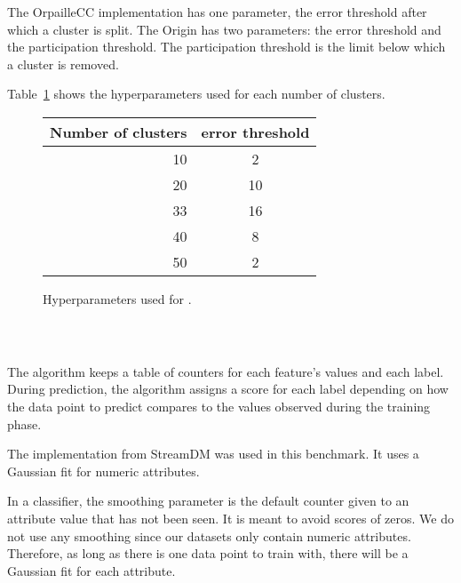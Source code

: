 The \mcnn OrpailleCC implementation has one
parameter, the error threshold after which a
cluster is split.  The \mcnn Origin has two
parameters: the error threshold and the
participation threshold. The participation
threshold is the limit below which a cluster is
removed.

Table~\ref{table:hyperparameter-mcnn} shows
the hyperparameters used for each number of clusters.
\begin{figure}
		\begin{center}
			\begin{tabular}{|| r | c ||} 
				\hline
				Number of clusters &  error threshold \\ [0.5ex] 
				\hline\hline
				10 & 2 \\
				20 & 10 \\
				33 & 16 \\
				40 & 8 \\
				50 & 2 \\
				\hline
			\end{tabular}
		\end{center}
		\caption{Hyperparameters used for \mcnn.}
		\label{table:hyperparameter-mcnn}
\end{figure}

\subsubsection{\naivebayes~\cite{naive_bayes}}
The \naivebayes algorithm keeps a table of
counters for each feature's values and each label.
During prediction, the algorithm assigns a
score for each label depending on how the data
point to predict compares to the values observed
during the training phase.

The implementation from StreamDM was used in this
benchmark. It uses a Gaussian
fit for numeric attributes.

In a \naivebayes classifier, the smoothing parameter is the
default counter given to an attribute value that
has not been seen. It is meant to avoid scores of zeros.
We do not use any smoothing since our datasets
only contain numeric
attributes. Therefore, as long as there is one data
point to train with, there will be a Gaussian
fit for each attribute.

